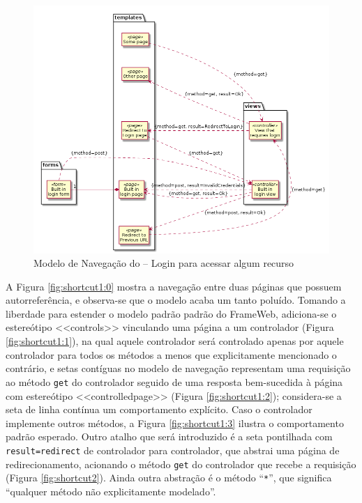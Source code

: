 \begin{figure}[H]
	\centering
	\includegraphics[scale=0.5]{figuras/navigation-extra.png}
	\caption{Modelo de Navegação do \imprimirtitulo{} -- Login para acessar algum recurso}
	\label{fig:nav1}
\end{figure}

A Figura \ref{fig:shortcut1:0} mostra a navegação entre duas páginas que possuem autorreferência, e observa-se que o modelo acaba um tanto poluído. Tomando a liberdade para estender o modelo padrão padrão do FrameWeb, adiciona-se o estereótipo <<controls>> vinculando uma página a um controlador (Figura \ref{fig:shortcut1:1}), na qual aquele controlador será controlado apenas por aquele controlador para todos os métodos a menos que explicitamente mencionado o contrário, e setas contíguas no modelo de navegação representam uma requisição ao método \texttt{get} do controlador seguido de uma resposta bem-sucedida à página com estereótipo <<controlledpage>> (Figura \ref{fig:shortcut1:2}); considera-se a seta de linha contínua um comportamento explícito. Caso o controlador implemente outros métodos, a Figura \ref{fig:shortcut1:3} ilustra o comportamento padrão esperado. Outro atalho que será introduzido é a seta pontilhada com \texttt{result=redirect} de controlador para controlador, que abstrai uma página de redirecionamento, acionando o método \texttt{get} do controlador que recebe a requisição (Figura \ref{fig:shortcut2}). Ainda outra abstração é o método ``\texttt{*}'', que significa ``qualquer método não explicitamente modelado''.

